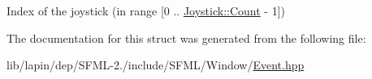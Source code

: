 Index of the joystick (in range \mbox{[}0 .. \hyperlink{classsf_1_1_joystick_aa49548ab614125923944b5d340f67a77a58bb2e8f3749310d61097e4361bc0ba8}{Joystick\-::\-Count} -\/ 1\mbox{]}) 



The documentation for this struct was generated from the following file\-:\begin{DoxyCompactItemize}
\item 
lib/lapin/dep/\-S\-F\-M\-L-\/2./include/\-S\-F\-M\-L/\-Window/\hyperlink{lib_2lapin_2dep_2_s_f_m_l-2_83_2include_2_s_f_m_l_2_window_2_event_8hpp}{Event.\-hpp}\end{DoxyCompactItemize}
